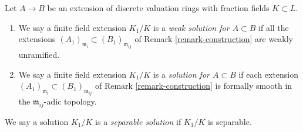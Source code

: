 \begin{definition}
\label{definition-solution}
Let $A \to B$ be an extension of discrete valuation rings with fraction
fields $K \subset L$.
\begin{enumerate}
\item We say a finite field extension $K_1/K$ is a
{\it weak solution for $A \subset B$} if all the extensions
$(A_1)_{\mathfrak m_i} \subset (B_1)_{\mathfrak m_{ij}}$ of
Remark \ref{remark-construction} are weakly unramified.
\item We say a finite field extension $K_1/K$ is a
{\it solution for $A \subset B$} if each extension
$(A_1)_{\mathfrak m_i} \subset (B_1)_{\mathfrak m_{ij}}$ of
Remark \ref{remark-construction} is formally smooth in
the $\mathfrak m_{ij}$-adic topology.
\end{enumerate}
We say a solution $K_1/K$ is a {\it separable solution}
if $K_1/K$ is separable.
\end{definition}